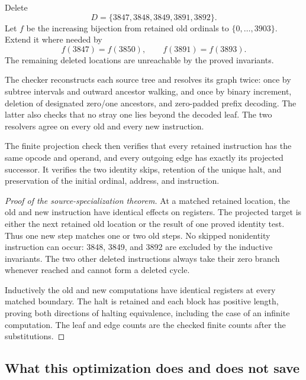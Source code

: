 \documentclass[11pt,a4paper]{article}
\theoremstyle{definition}
\begin{document}
Delete
\[
D=\{3847,3848,3849,3891,3892\}.
\]
Let $f$ be the increasing bijection from retained old ordinals to $\{0,\ldots,3903\}$. Extend it where needed by
\[
f(3847)=f(3850),\qquad f(3891)=f(3893).
\]
The remaining deleted locations are unreachable by the proved invariants.

The checker reconstructs each source tree and resolves its graph twice: once by subtree intervals and outward ancestor walking, and once by binary increment, deletion of designated zero/one ancestors, and zero-padded prefix decoding. The latter also checks that no stray one lies beyond the decoded leaf. The two resolvers agree on every old and every new instruction.

The finite projection check then verifies that every retained instruction has the same opcode and operand, and every outgoing edge has exactly its projected successor. It verifies the two identity skips, retention of the unique halt, and preservation of the initial ordinal, address, and instruction.

\begin{proof}[Proof of the source-specialization theorem]
At a matched retained location, the old and new instruction have identical effects on registers. The projected target is either the next retained old location or the result of one proved identity test. Thus one new step matches one or two old steps. No skipped nonidentity instruction can occur: 3848, 3849, and 3892 are excluded by the inductive invariants. The two other deleted instructions always take their zero branch whenever reached and cannot form a deleted cycle.

Inductively the old and new computations have identical registers at every matched boundary. The halt is retained and each block has positive length, proving both directions of halting equivalence, including the case of an infinite computation. The leaf and edge counts are the checked finite counts after the substitutions.
\end{proof}

\subsection{What this optimization does and does not save}
\end{document}
